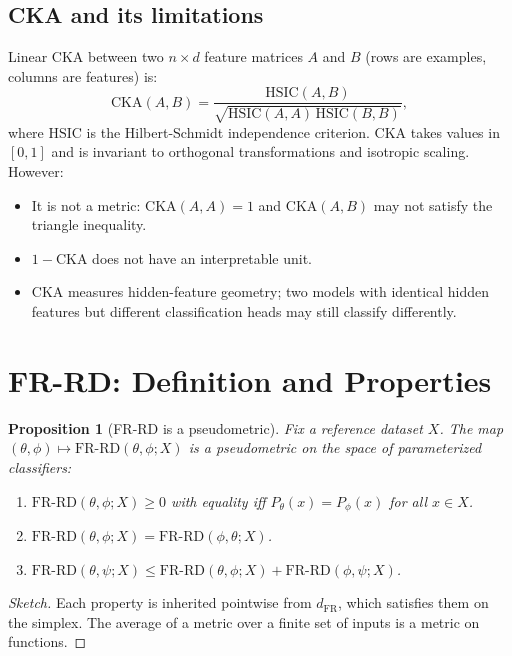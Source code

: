 \documentclass[11pt]{article}
\newtheorem{proposition}{Proposition}
\begin{document}
\subsection{CKA and its limitations}

Linear CKA \citep{kornblith2019similarity} between two $n \times d$ feature matrices $A$
and $B$ (rows are examples, columns are features) is:
\begin{equation}
  \mathrm{CKA}(A, B)
  = \frac{\mathrm{HSIC}(A, B)}{\sqrt{\mathrm{HSIC}(A,A)\,\mathrm{HSIC}(B,B)}},
\end{equation}
where $\mathrm{HSIC}$ is the Hilbert-Schmidt independence criterion. CKA takes values in
$[0,1]$ and is invariant to orthogonal transformations and isotropic scaling. However:
\begin{itemize}
  \item It is not a metric: CKA$(A,A)=1$ and CKA$(A,B)$ may not satisfy the triangle
        inequality.
  \item $1 - \mathrm{CKA}$ does not have an interpretable unit.
  \item CKA measures hidden-feature geometry; two models with identical hidden features
        but different classification heads may still classify differently.
\end{itemize}

\section{FR-RD: Definition and Properties}

\begin{proposition}[FR-RD is a pseudometric]
\label{prop:metric}
Fix a reference dataset $X$. The map $(\theta, \phi) \mapsto \mathrm{FR\text{-}RD}(\theta,
\phi; X)$ is a pseudometric on the space of parameterized classifiers:
\begin{enumerate}
  \item $\mathrm{FR\text{-}RD}(\theta, \phi; X) \ge 0$ with equality iff $P_\theta(x) =
        P_\phi(x)$ for all $x \in X$.
  \item $\mathrm{FR\text{-}RD}(\theta, \phi; X) = \mathrm{FR\text{-}RD}(\phi, \theta; X)$.
  \item $\mathrm{FR\text{-}RD}(\theta, \psi; X) \le \mathrm{FR\text{-}RD}(\theta, \phi; X)
        + \mathrm{FR\text{-}RD}(\phi, \psi; X)$.
\end{enumerate}
\end{proposition}
\begin{proof}[Sketch]
Each property is inherited pointwise from $d_{\mathrm{FR}}$, which satisfies them on the
simplex. The average of a metric over a finite set of inputs is a metric on functions.
\end{proof}
\end{document}
